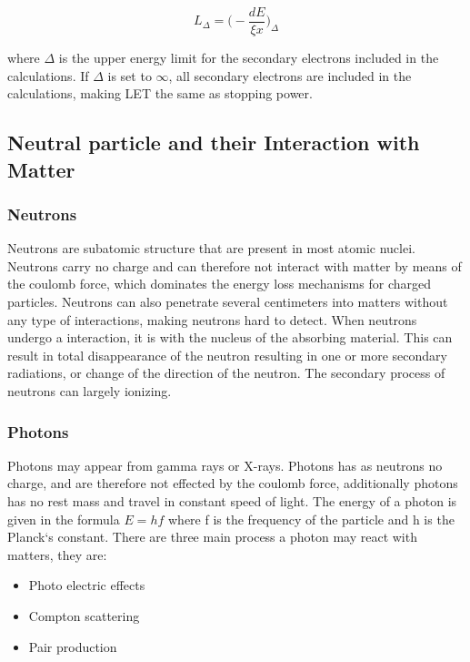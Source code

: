 \documentclass[12pt]{article}
\numberwithin{figure}{section}
\begin{document}
\begin{equation}
L_\Delta= \bigg(- \frac{dE}{\xi x}\bigg)_\Delta
\label{LET}
\end{equation}

where $\Delta$ is the upper energy limit for the secondary electrons included in the calculations.
If $\Delta$ is set to $\infty$, all secondary electrons are included in the calculations, making \ac{LET} the same as stopping power.

\subsection{Neutral particle and their Interaction with Matter}
\subsubsection{Neutrons}
Neutrons are subatomic structure that are present in most atomic nuclei.
Neutrons carry no charge and can therefore not interact with matter by means of the coulomb force,
which dominates the energy loss mechanisms for charged particles.
Neutrons can also penetrate several centimeters into matters without any type of interactions, making neutrons hard to detect.
When neutrons undergo a interaction, it is with the nucleus of the absorbing material.
This can result in total disappearance of the neutron resulting in one or more secondary radiations, or change of the direction of the neutron.  
The secondary process of neutrons can largely ionizing.

\subsubsection{Photons}
Photons may appear from gamma rays or X-rays. Photons has as neutrons no charge, and are therefore not effected by the coulomb force, additionally photons has no rest mass and travel in constant speed of light.
The energy of a photon is given in the formula $E=hf$ where f is the frequency of the particle and h is the Planck`s constant.
There are three main process a photon may react with matters, they are:

\begin{itemize}
  \item Photo electric effects \hfill
  \item Compton scattering \hfill
  \item Pair production \hfill
\end{itemize}
\end{document}
